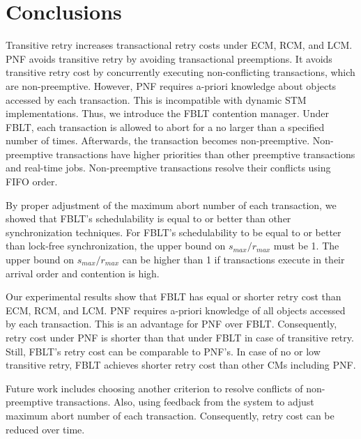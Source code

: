 \documentclass[conference]{IEEEtran}
\begin{document}
\section{Conclusions}\label{conclusion}

Transitive retry increases transactional retry costs under ECM, RCM, and LCM. PNF avoids transitive retry by avoiding transactional preemptions. It avoids transitive retry cost by concurrently executing non-conflicting transactions, which are non-preemptive. However, PNF requires a-priori knowledge about objects accessed by each transaction. This is incompatible with dynamic STM implementations. Thus, we introduce the FBLT contention manager. Under  FBLT, each transaction is allowed to abort for a no larger than a specified number of times. Afterwards, the transaction becomes non-preemptive. Non-preemptive transactions have higher priorities than other preemptive transactions and real-time jobs. Non-preemptive transactions resolve their conflicts using FIFO order.

By proper adjustment of the maximum abort number of each transaction, we showed that FBLT's schedulability is equal to or better than other synchronization techniques. For FBLT's schedulability to be equal to or better than lock-free synchronization, the upper bound on $s_{max}/r_{max}$ must be 1. The upper bound on $s_{max}/r_{max}$ can be higher than 1 if transactions execute in their arrival order and contention is high.

Our experimental results show that FBLT has equal or shorter retry cost than ECM, RCM, and LCM. PNF requires a-priori knowledge of all objects accessed by each transaction. This is an advantage for PNF over FBLT. Consequently, retry cost under PNF is shorter than that under FBLT in case of transitive retry. Still, FBLT's retry cost can be comparable to PNF's. In case of no or low transitive retry, FBLT achieves shorter retry cost than other CMs including PNF.

Future work includes choosing another criterion to resolve conflicts of non-preemptive transactions. Also, using feedback from the system to adjust maximum abort number of each transaction. Consequently, retry cost can be reduced over time.




\end{document}
